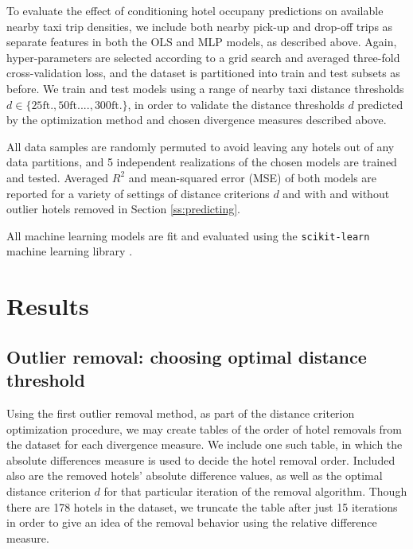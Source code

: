 \documentclass[useAMS, usenatbib]{biom}
\begin{document}
To evaluate the effect of conditioning hotel occupany predictions on available nearby taxi trip densities, we include both nearby pick-up and drop-off trips as separate features in both the OLS and MLP models, as described above. Again, hyper-parameters are selected according to a grid search and averaged three-fold cross-validation loss, and the dataset is partitioned into train and test subsets as before. We train and test models using a range of nearby taxi distance thresholds $d \in \{25 \mathrm{ft.}, 50 \mathrm{ft.} ..., 300 \mathrm{ft.} \}$, in order to validate the distance thresholds $d$ predicted by the optimization method and chosen divergence measures described above.

All data samples are randomly permuted to avoid leaving any hotels out of any data partitions, and 5 independent realizations of the chosen models are trained and tested. Averaged $R^2$ and mean-squared error (MSE) of both models are reported for a variety of settings of distance criterions $d$ and with and without outlier hotels removed in Section \ref{ss:predicting}.

All machine learning models are fit and evaluated using the \texttt{scikit-learn} machine learning library \citep{scikit-learn}.

\section{Results}
\label{s:results}

\subsection{Outlier removal: choosing optimal distance threshold}
\label{ss:optimization}

Using the first outlier removal method, as part of the distance criterion optimization procedure, we may create tables of the order of hotel removals from the dataset for each divergence measure. We include one such table, in which the absolute differences measure is used to decide the hotel removal order. Included also are the removed hotels' absolute difference values, as well as the optimal distance criterion $d$ for that particular iteration of the removal algorithm. Though there are 178 hotels in the dataset, we truncate the table after just 15 iterations in order to give an idea of the removal behavior using the relative difference measure.
\end{document}
